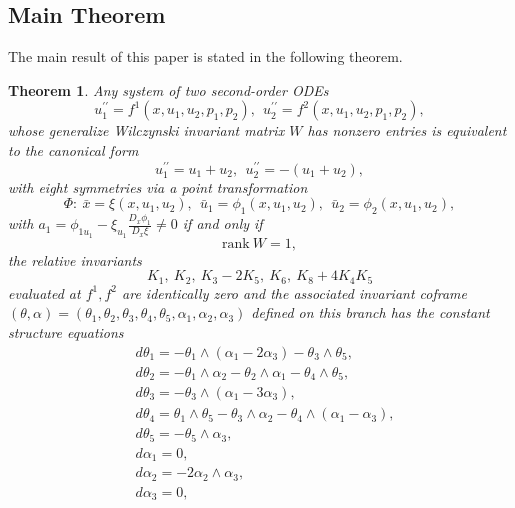 \documentclass[12pt]{article}
\newtheorem{theorem}{Theorem}[section]
\begin{document}
\subsection{Main Theorem}
The main result of this paper is stated in the following theorem.
\begin{theorem}\label{thm1}
Any system of two second-order ODEs 
\begin{equation}\label{191}
u_1^{\prime\prime}=f^1(x,u_1,u_2,p_1,p_2),~~u_2^{\prime\prime}=f^2(x,u_1,u_2,p_1,p_2),
\end{equation}
whose generalize Wilczynski invariant matrix $W$ has nonzero entries is equivalent to the canonical form 
\begin{equation}\label{s2-1}
u_1^{\prime\prime}=u_1+u_2,~~u_2^{\prime\prime}=-(u_1+u_2),
\end{equation}
with eight  symmetries via a point transformation 
\begin{equation}\label{}
\Phi:~\bar{x}=\xi(x,u_1,u_2),~~\bar{u}_1=\phi_1(x,u_1,u_2),~~\bar{u}_2=\phi_2(x,u_1,u_2),
\end{equation}
with $a_1=\phi_{1u_1}-\xi_{u_1}\frac{D_x\phi_1}{D_x\xi}\neq0$ if and only if  \begin{equation}
\text{rank}~ W=1,
\end{equation}
 the relative invariants 
\begin{equation}
K_1,~K_2,~K_3-2K_5,~K_6,~K_8+4K_4K_5
\end{equation}
 evaluated at $f^1,f^2$ are identically zero and the associated invariant coframe $(\theta,\alpha)=(\theta_1,\theta_2,\theta_3,\theta_4,\theta_5,\alpha_1,\alpha_2,\alpha_3)$ defined on this branch has the constant structure equations
\begin{equation}\label{8sym}
\begin{aligned}
&d\theta_1=-\theta_1\wedge(\alpha_1-2\alpha_3)-\theta_3\wedge\theta_5,\\
&d\theta_2=-\theta_1\wedge\alpha_2-\theta_2\wedge\alpha_1-\theta_4\wedge\theta_5,\\
&d\theta_3=-\theta_3\wedge(\alpha_1-3\alpha_3),\\
&d\theta_4=\theta_1\wedge\theta_5-\theta_3\wedge\alpha_2-\theta_4\wedge(\alpha_1-\alpha_3),\\
&d\theta_5=-\theta_5\wedge\alpha_3,\\
&d\alpha_1=0,\\
&d\alpha_2=-2\alpha_2\wedge\alpha_3,\\
&d\alpha_3=0,
\end{aligned}

\end{equation}
\end{theorem}
\end{document}

